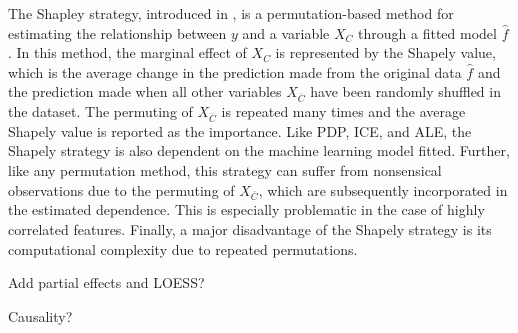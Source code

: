 \documentclass[12pt]{article}
\begin{document}
The Shapley strategy, introduced in \cite{lundberg2016unexpected}, is a permutation-based method for estimating the relationship between ${y}$ and a variable $X_C$ through a fitted model $\widehat{f}$. In this method, the marginal effect of $X_C$ is represented by the Shapely value, which is the average change in the prediction made from the original data $\widehat{f}$ and the prediction made when all other variables $X_{\overline{C}}$ have been randomly shuffled in the dataset. The permuting of $X_{\overline{C}}$ is repeated many times and the average Shapely value is reported as the importance. Like PDP, ICE, and ALE, the Shapely strategy is also dependent on the machine learning model fitted. Further, like any permutation method, this strategy can suffer from nonsensical observations due to the permuting of $X_{\overline{C}}$, which are subsequently incorporated in the estimated dependence. This is especially problematic in the case of highly correlated features. Finally, a major disadvantage of the Shapely strategy is its computational complexity due to repeated permutations. 

{\color{red} Add partial effects and LOESS?}

{\color{red} Causality?}





\end{document}
